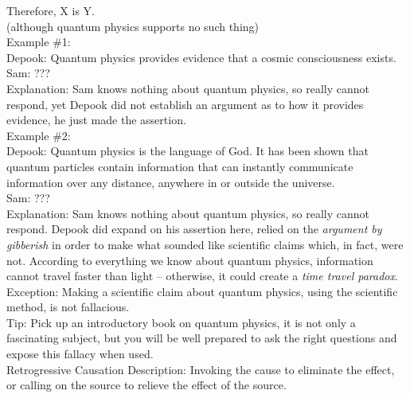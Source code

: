 \documentclass[a4paper,12pt,single,pdftex]{scrbook}
\begin{document}
      
        Therefore, X is Y.
      \\

      
        (although quantum physics supports no such thing)
      \\

      
        Example \#1:
      \\

      
        Depook: Quantum physics provides evidence that a cosmic consciousness exists.
      \\

      
        Sam: ???
      \\

      
        Explanation: Sam knows nothing about quantum physics, so really cannot respond, yet Depook did not establish an argument as to how it provides evidence, he just made the assertion. 
      \\

      
        Example \#2:
      \\

      
        Depook: Quantum physics is the language of God.  It has been shown that quantum particles contain information that can instantly communicate information over any distance, anywhere in or outside the universe.
      \\

      
        Sam: ???
      \\

      
        Explanation: Sam knows nothing about quantum physics, so really cannot respond.  Depook did expand on his assertion here, relied on the {\it argument by gibberish} in order to make what sounded like scientific claims which, in fact, were not.  According to everything we know about quantum physics, information cannot travel faster than light -- otherwise, it could create a {\it time travel paradox}.
      \\

      
        Exception: Making a scientific claim about quantum physics, using the scientific method, is not fallacious.
      \\

      
        Tip: Pick up an introductory book on quantum physics, it is not only a fascinating subject, but you will be well prepared to ask the right questions and expose this fallacy when used.
      \\

    
  

Retrogressive Causation
    Description: Invoking the cause to eliminate the effect, or calling on the source to relieve the effect of the source.
\end{document}
